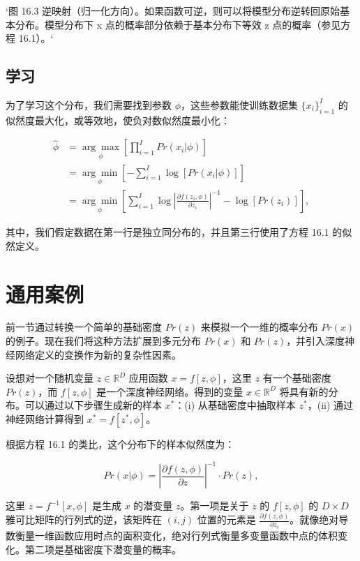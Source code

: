 `图 16.3 逆映射（归一化方向）。如果函数可逆，则可以将模型分布逆转回原始基本分布。模型分布下 x 点的概率部分依赖于基本分布下等效 z 点的概率（参见方程 16.1）。`

\subsection{学习}

为了学习这个分布，我们需要找到参数 \(\phi\)，这些参数能使训练数据集 \(\{x_i\}_{i=1}^I\) 的似然度最大化，或等效地，使负对数似然度最小化：


\begin{align}
\hat{\phi} &= \underset{\phi}{\arg\max} \left[ \prod_{i=1}^I Pr(x_i|\phi) \right] \\
&= \underset{\phi}{\arg\min} \left[ -\sum_{i=1}^I \log[Pr(x_i|\phi)] \right] \\
&= \underset{\phi}{\arg\min} \left[ \sum_{i=1}^I \log \left| \frac{\partial f(z_i, \phi)}{\partial z_i} \right|^{-1} - \log[Pr(z_i)] \right],
\end{align} 


其中，我们假定数据在第一行是独立同分布的，并且第三行使用了方程 16.1 的似然定义。


\section{通用案例}
前一节通过转换一个简单的基础密度 \(Pr(z)\) 来模拟一个一维的概率分布 \(Pr(x)\) 的例子。现在我们将这种方法扩展到多元分布 \(Pr(x)\) 和 \(Pr(z)\)，并引入深度神经网络定义的变换作为新的复杂性因素。

设想对一个随机变量 \(z \in \mathbb{R}^D\) 应用函数 \(x = f[z, \phi]\)，这里 \(z\) 有一个基础密度 \(Pr(z)\)，而 \(f[z, \phi]\) 是一个深度神经网络。得到的变量 \(x \in \mathbb{R}^D\) 将具有新的分布。可以通过以下步骤生成新的样本 \(x^*\)：(i) 从基础密度中抽取样本 \(z^*\)，(ii) 通过神经网络计算得到 \(x^* = f[z^*, \phi]\)。

根据方程 16.1 的类比，这个分布下的样本似然度为：

\[
Pr(x|\phi) = \left| \frac{\partial f(z, \phi)}{\partial z} \right|^{-1} \cdot Pr(z), \tag{16.3}
\]

这里 \(z = f^{-1}[x, \phi]\) 是生成 \(x\) 的潜变量 \(z\)。第一项是关于 \(z\) 的 \(f[z, \phi]\) 的 \(D \times D\) 雅可比矩阵的行列式的逆，该矩阵在 \((i, j)\) 位置的元素是 \(\frac{\partial f(z, \phi)}{\partial z_i}\)。就像绝对导数衡量一维函数应用时点的面积变化，绝对行列式衡量多变量函数中点的体积变化。第二项是基础密度下潜变量的概率。

